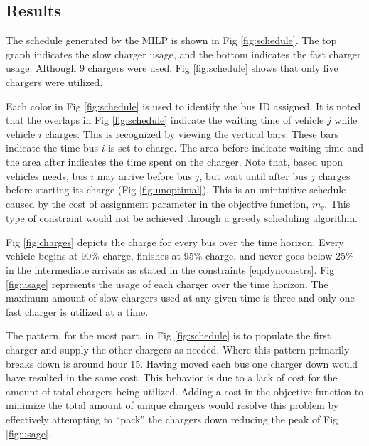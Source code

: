 \documentclass[letterpaper, 10pt, conference]{IEEEtran}
\begin{document}
\subsection{Results}
The schedule generated by the MILP is shown in Fig \ref{fig:schedule}. The top graph indicates the slow charger usage,
and the bottom indicates the fast charger usage. Although $9$ chargers were used, Fig \ref{fig:schedule} shows that
only five chargers were utilized.

Each color in Fig \ref{fig:schedule} is used to identify the bus ID assigned. It is noted that the overlaps in Fig
\ref{fig:schedule} indicate the waiting time of vehicle $j$ while vehicle $i$ charges. This is recognized by viewing the
vertical bars. These bars indicate the time bus $i$ is set to charge. The area before indicate waiting time and the area
after indicates the time spent on the charger. Note that, based upon vehicles needs, bus $i$ may arrive before bus $j$,
but wait until after bus $j$ charges before starting its charge (Fig \ref{fig:unoptimal}). This is an unintuitive
schedule caused by the cost of assignment parameter in the objective function, $m_q$. This type of constraint would not
be achieved through a greedy scheduling algorithm.

Fig \ref{fig:charges} depicts the charge for every bus over the time horizon. Every vehicle begins at 90\% charge,
finishes at 95\% charge, and never goes below 25\% in the intermediate arrivals as stated in the constraints
\eqref{eq:dynconstrs}. Fig \ref{fig:usage} represents the usage of each charger over the time horizon. The maximum
amount of slow chargers used at any given time is three and only one fast charger is utilized at a time.

The pattern, for the most part, in Fig \ref{fig:schedule} is to populate the first charger and supply the other chargers
as needed. Where this pattern primarily breaks down is around hour 15. Having moved each bus one charger down would have
resulted in the same cost. This behavior is due to a lack of cost for the amount of total chargers being utilized.
Adding a cost in the objective function to minimize the total amount of unique chargers would resolve this problem by
effectively attempting to ``pack'' the chargers down reducing the peak of Fig \ref{fig:usage}.
\end{document}
